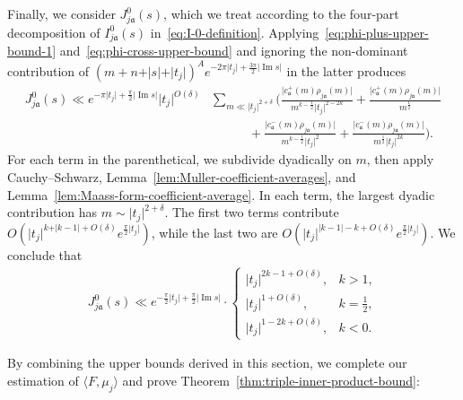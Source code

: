 \documentclass[11pt,reqno]{amsart}
\theoremstyle{plain}
\theoremstyle{definition}
\numberwithin{equation}{section}
\renewcommand{\Im}{\operatorname{Im}}
\begin{document}
Finally, we consider $J_{j\mathfrak{a}}^0(s)$, which we treat according to the four-part decomposition of $I_{j\mathfrak{a}}^0(s)$ in~\eqref{eq:I-0-definition}. Applying~\eqref{eq:phi-plus-upper-bound-1} and~\eqref{eq:phi-cross-upper-bound} and ignoring the non-dominant contribution of $(m+n+ \vert s \vert + \vert t_j \vert)^A e^{-2\pi \vert t_j \vert + \frac{3\pi}{2} \vert \Im s \vert}$ in the latter produces
\begin{align*}
	J_{j\mathfrak{a}}^0(s)
	\ll e^{-\pi \vert t_j \vert + \frac{\pi}{2} \vert \Im s \vert} \vert t_j \vert^{O(\delta)} \!\!\!
	& \sum_{m \ll \vert t_j \vert^{2+\delta}} \!\!
	\Big( \frac{\vert c_\mathfrak{a}^+(m) \rho_{j\mathfrak{a}}(m) \vert}
				{m^{k-\frac{1}{2}} \vert t_j \vert^{2-2k}} 
		+ \frac{\vert c_\mathfrak{a}^+(m) \rho_{j\mathfrak{a}}(m) \vert}{m^{\frac{1}{2}}} 
		 \\
	& \qquad \quad
	+ \frac{\vert c_\mathfrak{a}^-(m) \rho_{j\mathfrak{a}}(m) \vert}{m^{k-\frac{1}{2}} \vert t_j \vert^2} 
	+ \frac{\vert c_\mathfrak{a}^-(m) \rho_{j\mathfrak{a}}(m) \vert}{m^{\frac{1}{2}} \vert t_j \vert^{2k}} 
	\Big).
\end{align*}
For each term in the parenthetical, we subdivide dyadically on $m$, then apply Cauchy--Schwarz, Lemma~\ref{lem:Muller-coefficient-averages}, and Lemma~\ref{lem:Maass-form-coefficient-average}. In each term, the largest dyadic contribution has $m \sim \vert t_j \vert^{2+\delta}$. The first two terms contribute $O(\vert t_j \vert^{k+ \vert k-1 \vert + O(\delta)} e^{\frac{\pi}{2} \vert t_j \vert})$, while the last two are $O(\vert t_j \vert^{\vert k-1 \vert -k + O(\delta)} e^{\frac{\pi}{2} \vert t_j \vert})$. We conclude that
\begin{align} \label{eq:J-0-upper-bound}
	J_{j\mathfrak{a}}^0(s)
	\ll e^{-\frac{\pi}{2} \vert t_j \vert + \frac{\pi}{2} \vert \Im s \vert} 
	\cdot \begin{cases}
		\vert t_j \vert^{2k-1+O(\delta)}, & k > 1, \\
		\vert t_j \vert^{1+O(\delta)}, & k = \frac{1}{2}, \\
		\vert t_j \vert^{1-2k+O(\delta)}, & k < 0.
	\end{cases}
\end{align}

By combining the upper bounds derived in this section, we complete our estimation of $\langle F, \mu_j \rangle $ and prove Theorem~\ref{thm:triple-inner-product-bound}:
\end{document}
